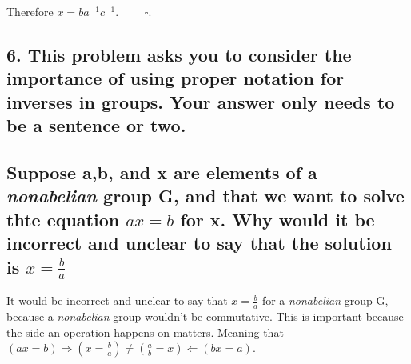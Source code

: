 \documentclass[
]{article}
\begin{document}
Therefore \(x=ba^{-1}c^{-1}\). \(\quad\quad\square\).

\hypertarget{this-problem-asks-you-to-consider-the-importance-of-using-proper-notation-for-inverses-in-groups.-your-answer-only-needs-to-be-a-sentence-or-two.}{%
\subsection{6. This problem asks you to consider the importance of using
proper notation for inverses in groups. Your answer only needs to be a
sentence or
two.}\label{this-problem-asks-you-to-consider-the-importance-of-using-proper-notation-for-inverses-in-groups.-your-answer-only-needs-to-be-a-sentence-or-two.}}

\hypertarget{suppose-ab-and-x-are-elements-of-a-nonabelian-group-g-and-that-we-want-to-solve-thte-equation-axb-for-x.-why-would-it-be-incorrect-and-unclear-to-say-that-the-solution-is-xfracba}{%
\subsection{\texorpdfstring{Suppose a,b, and x are elements of a
\emph{nonabelian} group G, and that we want to solve thte equation
\(ax=b\) for x. Why would it be incorrect and unclear to say that the
solution is
\(x=\frac{b}{a}\)}{Suppose a,b, and x are elements of a nonabelian group G, and that we want to solve thte equation ax=b for x. Why would it be incorrect and unclear to say that the solution is x=\textbackslash frac\{b\}\{a\}}}\label{suppose-ab-and-x-are-elements-of-a-nonabelian-group-g-and-that-we-want-to-solve-thte-equation-axb-for-x.-why-would-it-be-incorrect-and-unclear-to-say-that-the-solution-is-xfracba}}

It would be incorrect and unclear to say that \(x=\frac{b}{a}\) for a
\emph{nonabelian} group G, because a \emph{nonabelian} group wouldn't be
commutative. This is important because the side an operation happens on
matters. Meaning that
\((ax=b)\Rightarrow (x=\frac{b}{a})\ne(\frac{a}{b}=x)\Leftarrow (bx=a)\).
\end{document}
